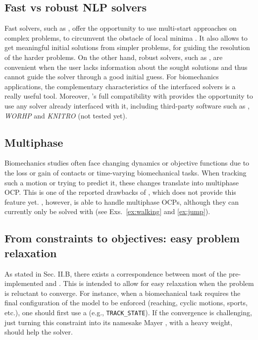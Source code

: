 \subsection{Fast vs robust NLP solvers}

Fast solvers, such as \acados, offer the opportunity to use multi-start approaches on complex problems, to circumvent the obstacle of local minima \cite{huchez2015local, bailly2020optimal}.
It also allows to get meaningful initial solutions from simpler problems, for guiding the resolution of the harder problems.
On the other hand, robust solvers, such as \ipopt, are convenient when the user lacks information about the sought solutions and thus cannot guide the solver through a good initial guess.
For biomechanics applications, the complementary characteristics of the interfaced solvers is a really useful tool.
Moreover, \bioptim's full compatibility with \casadi provides the opportunity to use any solver already interfaced with it, including third-party software such as \snopt, \textit{WORHP} \cite{wassel2013exploring} and \textit{KNITRO} \cite{nocedal2006knitro} (not tested yet). 

\subsection{Multiphase}

Biomechanics studies often face changing dynamics or objective functions due to the loss or gain of contacts or time-varying biomechanical tasks.
When tracking such a motion or trying to predict it, these changes translate into multiphase OCP.
This is one of the reported drawbacks of \moco \addref, which does not provide this feature yet.
\bioptim, however, is able to handle multiphase OCPs, although they can currently only be solved with \ipopt (see Exs.~\ref{ex:walking} and \ref{ex:jump}).


\subsection{From constraints to objectives: easy problem relaxation}

As stated in Sec. II.B, there exists a correspondence between most of the pre-implemented \constraints and \objectives.
This is intended to allow for easy relaxation when the problem is reluctant to converge. 
For instance, when a biomechanical task requires the final configuration of the model to be enforced (reaching, cyclic motions, sports, etc.), one should first use a \constraint (e.g., \texttt{TRACK\_STATE}).
If the convergence is challenging, just turning this constraint into its namesake Mayer \objective, with a heavy weight, should help the solver.

